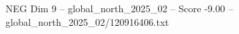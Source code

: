 \begin{textsample}{NEG Dim 9 – global\_north\_2025\_02 – Score -9.00 – global\_north\_2025\_02/120916406.txt}
\end{textsample}
